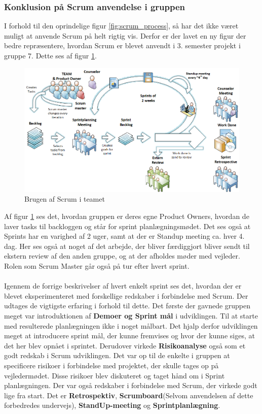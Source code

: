 \documentclass[a4paper,12pt,fleqn,oneside]{article}
\begin{document}
\subsubsection{Konklusion på Scrum anvendelse i gruppen}
I forhold til den oprindelige figur \ref{fig:scrum_process}, så har det ikke været muligt at anvende Scrum på helt rigtig vis. Derfor er der lavet en ny figur der bedre repræsentere, hvordan Scrum er blevet anvendt i 3. semester projekt i gruppe 7. Dette ses af figur \ref{fig:Scrum_usage}.
\begin{figure}[H]
    \centering
    \includegraphics[width=\textwidth]{Processdokument/graphics/Scrum_usage.png}
    \caption{Brugen af Scrum i teamet}
    \label{fig:Scrum_usage}
\end{figure}
Af figur \ref{fig:Scrum_usage} ses det, hvordan gruppen er deres egne Product Owners, hvordan de laver tasks til backloggen og står for sprint planlægningsmødet. Det ses også at Sprints har en varighed af 2 uger, samt at der er Standup meeting ca. hver 4. dag. Her ses også at noget af det arbejde, der bliver færdiggjort bliver sendt til ekstern review af den anden gruppe, og at der afholdes møder med vejleder. Rolen som Scrum Master går også på tur efter hvert sprint.
\\\\Igennem de forrige beskrivelser af hvert enkelt sprint ses det, hvordan der er blevet eksperimenteret med forskellige redskaber i forbindelse med Scrum. Der udtages de vigtigste erfaring i forhold til dette. Det første der gavnede gruppen meget var introduktionen af \textbf{Demoer og Sprint mål} i udviklingen. Til at starte med resulterede planlægningen ikke i noget målbart. Det hjalp derfor udviklingen meget at introducere sprint mål, der kunne fremvises og hvor der kunne siges, at det her blev opnået i sprintet. Derudover virkede \textbf{Risikoanalyse} også som et godt redskab i Scrum udviklingen. Det var op til de enkelte i gruppen at specificere risikoer i forbindelse med projektet, der skulle tages op på vejledermødet. Disse risikoer blev diskuteret og taget hånd om i Sprint planlægningen. Der var også redskaber i forbindelse med Scrum, der virkede godt lige fra start. Det er \textbf{Retrospektiv}, \textbf{Scrumboard}(Selvom anvendelsen af dette forbedredes undervejs), \textbf{StandUp-meeting} og \textbf{Sprintplanlægning}.
\end{document}
